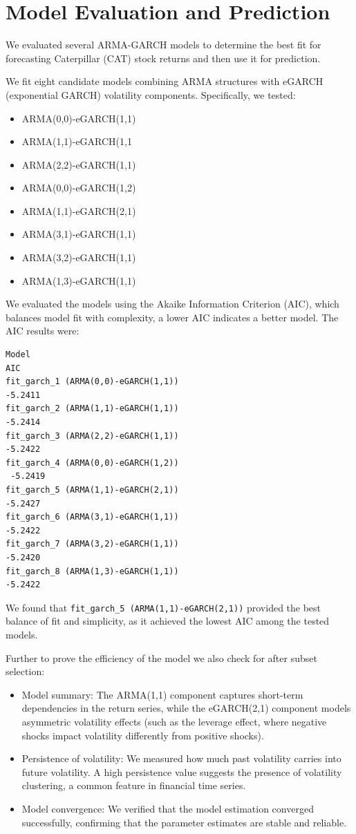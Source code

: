 \documentclass{article}
\begin{document}
\section{Model Evaluation and Prediction}
We evaluated several ARMA-GARCH models to determine the best fit for forecasting Caterpillar (CAT) stock returns and then use it for prediction.

We fit eight candidate models combining ARMA structures with eGARCH (exponential GARCH) volatility components. Specifically, we tested:
\begin{itemize}
	\item ARMA(0,0)-eGARCH(1,1)
	\item ARMA(1,1)-eGARCH(1,1
	\item ARMA(2,2)-eGARCH(1,1)
	\item ARMA(0,0)-eGARCH(1,2)
	\item ARMA(1,1)-eGARCH(2,1)
	\item ARMA(3,1)-eGARCH(1,1)
	\item ARMA(3,2)-eGARCH(1,1)
	\item ARMA(1,3)-eGARCH(1,1)
\end{itemize}

We evaluated the models using the Akaike Information Criterion (AIC), which balances model fit with complexity, a lower AIC indicates a better model. The AIC results were:
\begin{verbatim}
Model
AIC
fit_garch_1 (ARMA(0,0)-eGARCH(1,1))
-5.2411 
fit_garch_2 (ARMA(1,1)-eGARCH(1,1))
-5.2414
fit_garch_3 (ARMA(2,2)-eGARCH(1,1))
-5.2422
fit_garch_4 (ARMA(0,0)-eGARCH(1,2))
 -5.2419
fit_garch_5 (ARMA(1,1)-eGARCH(2,1))
-5.2427
fit_garch_6 (ARMA(3,1)-eGARCH(1,1))
-5.2422
fit_garch_7 (ARMA(3,2)-eGARCH(1,1))
-5.2420
fit_garch_8 (ARMA(1,3)-eGARCH(1,1))
-5.2422
\end{verbatim}

We found that \texttt{fit\_garch\_5 (ARMA(1,1)-eGARCH(2,1))} provided the best balance of fit and simplicity, as it achieved the lowest AIC among the tested models.

Further to prove the efficiency of the model we also check for after subset selection:

\begin{itemize}
	\item Model summary: The ARMA(1,1) component captures short-term dependencies in the return series, while the eGARCH(2,1) component models asymmetric volatility effects (such as the leverage effect, where negative shocks impact volatility differently from positive shocks).


\item Persistence of volatility: We measured how much past volatility carries into future volatility. A high persistence value suggests the presence of volatility clustering, a common feature in financial time series.


\item Model convergence: We verified that the model estimation converged successfully, confirming that the parameter estimates are stable and reliable.
\end{itemize}
\end{document}
